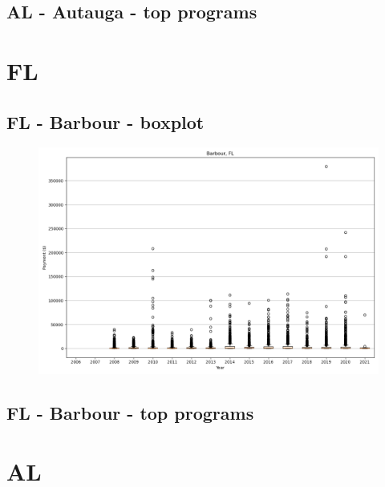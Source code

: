\subsection*{AL - Autauga - top programs}

\newpage
\section*{FL}
\subsection*{FL - Barbour - boxplot}
\begin{figure}[h]
\centering
\includegraphics[width=7in]{../output/boxplots/counties/Barbour-FL_boxplot.png}
\end{figure}


\subsection*{FL - Barbour - top programs}

\newpage
\section*{AL}
